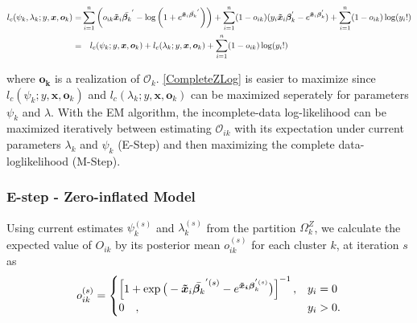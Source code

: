 \documentclass[11pt,letterpaper]{article}
\numberwithin{equation}{section}
\numberwithin{equation}{section}
\numberwithin{equation}{section}
\begin{document}
\begin{align}
l_c(\psi_k,\lambda_k;y,\bm{x},\bm{o}_k ) = & \sum_{i=1}^n \left( o_{ik}\bm{\tilde{x}}_i \bar{\bm{\beta}_k }^{'} - \log\left(1+ e^{ \bm{\tilde{x}}_i \bar{\bm{\beta}_k }^{'}}\right) \right) + \sum_{i=1}^n (1-o_{ik}) (y_i \bm{\tilde{x}}_i \bm{\beta}_k^{'}  - e^{\bm{\tilde{x}}_i \bm{\beta}_k^{'}}) + \sum_{i=1}^n (1-o_{ik})\log(y_i!) \nonumber \\
=  & \quad l_c(\psi_k;y,\bm{x},\bm{o}_k) + l_c(\lambda_k; y,\bm{x},\bm{o}_k) + \sum_{i=1}^n (1- o_{ik})\log(y_i!) \label{CompleteZLog}
\end{align}

where $\bm{o_{k}}$ is a realization of $ \mathcal{O}_{k} $. \eqref{CompleteZLog} is easier to maximize since $l_c(\psi_k; y,\bm{x},\bm{o}_k) $ and $l_c(\lambda_k; y,\bm{x},\bm{o}_k) $ can be maximized seperately for parameters $\psi_k$ and $\lambda$. With the EM algorithm, the incomplete-data log-likelihood can be maximized iteratively between estimating $\mathcal{O}_{ik}$ with its expectation under current parameters $\lambda_k$ and $\psi_k$ (E-Step) and then maximizing the complete data-loglikelihood (M-Step).

\subsubsection{E-step -  Zero-inflated Model}%

Using current estimates $\psi_k^{(s)}$ and $ \lambda_k^{(s)} $ from the partition $ \Omega^Z_{k}$, we calculate the expected value of ${O_{ik}}$ by its posterior mean ${o_{ik}^{(s)}}$ for each cluster $k$, at iteration $s$ as
\begin{align*}
o_{ik}^{(s)} = \begin{cases}  \left[ 1 + \exp{\big(-\bm{\tilde{x}}_i \bar{\bm{\beta}_k}^{'(s)} - e^ {\bm{\bm{\tilde{x}}_i} \bm{\beta}_k^{'(s)}} \big) } \right]^{-1}, &  y_{i} = 0 \\
  0 \quad , & y_{i}> 0 .
\end{cases}
\end{align*}
\end{document}
